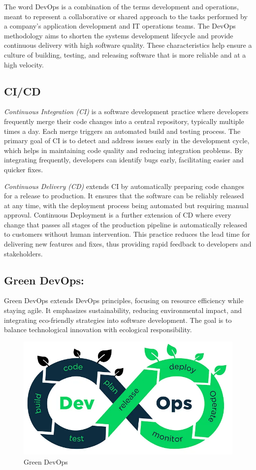 The word DevOps is a combination of the terms development and operations, meant to represent a collaborative or shared approach to the tasks performed by a company's application development and IT operations teams.
The DevOps methodology aims to shorten the systems development lifecycle and provide continuous delivery with high software quality. These characteristics help ensure a culture of building, testing, and releasing software that is more reliable and at a high velocity.

\subsection{CI/CD}
\textit{Continuous Integration (CI)} is a software development practice where developers frequently merge their code changes into a central repository, typically multiple times a day. Each merge triggers an automated build and testing process. The primary goal of CI is to detect and address issues early in the development cycle, which helps in maintaining code quality and reducing integration problems. By integrating frequently, developers can identify bugs early, facilitating easier and quicker fixes.

\textit{Continuous Delivery (CD)} extends CI by automatically preparing code changes for a release to production. It ensures that the software can be reliably released at any time, with the deployment process being automated but requiring manual approval. Continuous Deployment is a further extension of CD where every change that passes all stages of the production pipeline is automatically released to customers without human intervention. This practice reduces the lead time for delivering new features and fixes, thus providing rapid feedback to developers and stakeholders.


\subsection{Green DevOps:}
Green DevOps extends DevOps principles, focusing on resource efficiency while staying agile. It emphasizes sustainability, reducing environmental impact, and integrating eco-friendly strategies into software development. The goal is to balance technological innovation with ecological responsibility.
\begin{figure}[H]
  \centering
  \includegraphics[width=16cm]{Figures/devgreenops.png}
  \caption{Green DevOps}
\end{figure}
